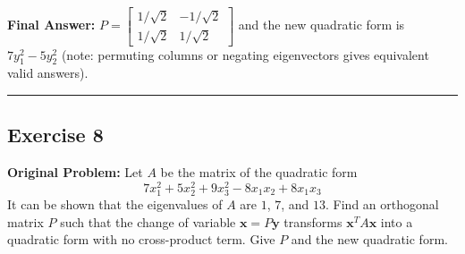 \documentclass[11pt, letterpaper]{article}
\theoremstyle{definition}
\theoremstyle{remark}
\begin{document}
\textbf{Final Answer:} $P = \begin{bmatrix} 1/\sqrt{2} & -1/\sqrt{2} \\ 1/\sqrt{2} & 1/\sqrt{2} \end{bmatrix}$ and the new quadratic form is $7y_1^2 - 5y_2^2$ (note: permuting columns or negating eigenvectors gives equivalent valid answers).

\medskip\hrule\medskip

\subsection*{Exercise 8}
\textbf{Original Problem:} Let $A$ be the matrix of the quadratic form
\[
7x_1^2 + 5x_2^2 + 9x_3^2 - 8x_1x_2 + 8x_1x_3
\]
It can be shown that the eigenvalues of $A$ are $1$, $7$, and $13$. Find an orthogonal matrix $P$ such that the change of variable $\mathbf{x} = P\mathbf{y}$ transforms $\mathbf{x}^T A \mathbf{x}$ into a quadratic form with no cross-product term. Give $P$ and the new quadratic form.
\end{document}
